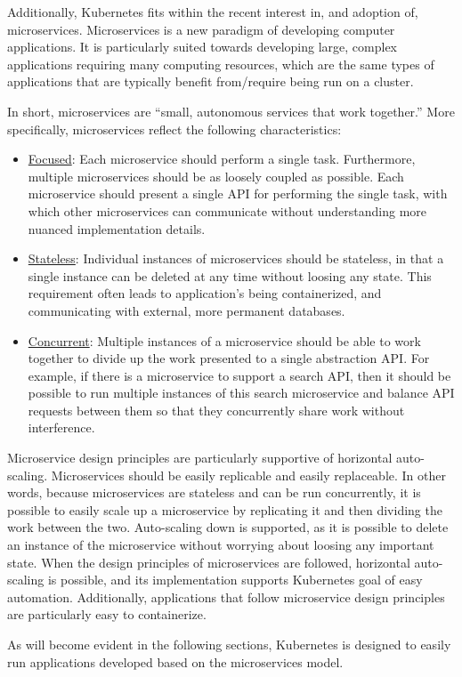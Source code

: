 Additionally, Kubernetes fits within the recent interest in, and adoption of,
microservices. Microservices is a new paradigm of developing computer
applications. It is particularly suited towards developing large, complex
applications requiring many computing resources, which are the
same types of applications that are typically benefit from/require
being run on a cluster.

In short, microservices are ``small, autonomous services that work
together.''\cite[pg. 2]{building-microservices-designing-fine-grained-systems}
More specifically, microservices reflect the following characteristics:

\begin{itemize}
  \item \underline{Focused}: Each microservice should perform a single task.
    Furthermore, multiple microservices should be as loosely coupled as
    possible. Each microservice should present a single API for performing the
    single task, with which other microservices can communicate without
    understanding more nuanced implementation
    details.\cite{building-microservices-designing-fine-grained-systems}
  \item \underline{Stateless}: Individual instances of microservices should be stateless, in
    that a single instance can be deleted at any time without loosing any state.
    This requirement often leads to application's being containerized, and
    communicating with external, more permanent databases.
  \item \underline{Concurrent}: Multiple instances of a microservice should be
    able to work together to divide up the work presented to a single
    abstraction API. For example, if there is a microservice to support
    a search API, then it should be possible to run multiple instances of this
    search microservice and balance API requests between them so that they
    concurrently share work without interference.
\end{itemize}

Microservice design principles are particularly supportive of horizontal
auto-scaling. Microservices should be easily replicable and easily replaceable.
In other words, because microservices are stateless and can be run concurrently,
it is possible to easily scale up a microservice by replicating it and then
dividing the work between the two. Auto-scaling down is supported, as it is
possible to delete an instance of the microservice without worrying about
loosing any important state. When the design principles of
microservices are followed, horizontal auto-scaling is possible, and its
implementation supports Kubernetes goal of easy automation. Additionally,
applications that follow microservice design principles are particularly easy to
containerize.

As will become evident in the following sections, Kubernetes is designed to
easily run applications developed based on the microservices model.
